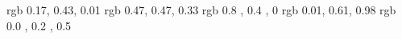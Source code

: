 
\usepackage{color}
\usepackage{listings}    
\usepackage{courier}

\definecolor{arduinoGreen}    {rgb} {0.17, 0.43, 0.01}
\definecolor{arduinoGrey}     {rgb} {0.47, 0.47, 0.33}
\definecolor{arduinoOrange}   {rgb} {0.8 , 0.4 , 0   }
\definecolor{arduinoBlue}     {rgb} {0.01, 0.61, 0.98}
\definecolor{arduinoDarkBlue} {rgb} {0.0 , 0.2 , 0.5 }

